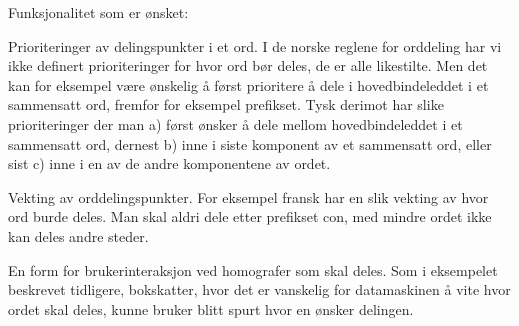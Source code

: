 Funksjonalitet som er ønsket:

\begin{items}
\item Prioriteringer av delingspunkter i et ord. I de norske reglene for orddeling har vi ikke definert prioriteringer for hvor ord bør deles, de er alle likestilte. Men det kan for eksempel være ønskelig å først prioritere å dele i hovedbindeleddet i et sammensatt ord, fremfor for eksempel prefikset. Tysk derimot har slike prioriteringer der man a) først ønsker å dele mellom hovedbindeleddet i et sammensatt ord, dernest b) inne i siste komponent av et sammensatt ord, eller sist c) inne i en av de andre komponentene av ordet.
\item Vekting av orddelingspunkter. For eksempel fransk har en slik vekting av hvor ord burde deles. Man skal aldri dele etter prefikset con, med mindre ordet ikke kan deles andre steder.
\item En form for brukerinteraksjon ved homografer som skal deles. Som i eksempelet beskrevet tidligere, bokskatter, hvor det er vanskelig for datamaskinen å vite hvor ordet skal deles, kunne bruker blitt spurt hvor en ønsker delingen.
\end{items}